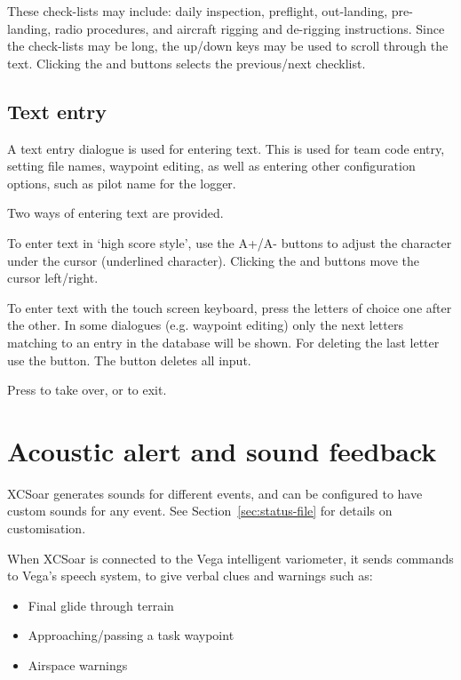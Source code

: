 These check-lists may include: daily inspection, preflight,
out-landing,  pre-landing, radio
procedures, and aircraft rigging and de-rigging instructions.  Since
the check-lists may be long, the up/down keys may be used to scroll
through the text. Clicking the \button{$<$} and \button{$>$} buttons
selects the previous/next checklist.


\subsection*{Text entry} \label{sec:textentry}

A text entry dialogue is used for entering text.  This is used for team
code entry, setting file names, waypoint editing, as well as entering
other configuration options, such as pilot name for the logger.

Two ways of entering text are provided. 

To enter text in `high score style', use the A+/A- buttons to adjust the 
character under the cursor (underlined character). Clicking the \button{$<$} 
and \button{$>$} buttons move the cursor left/right.  

To enter text with the touch screen keyboard, press the letters of choice 
one after the other. In some dialogues (e.g. waypoint editing) only the next 
letters matching to an entry in the database will be shown. For deleting the 
last letter use the \button{$<-$} button. The  button deletes all input.

Press  to take over, or  to exit.


\section{Acoustic alert and sound feedback}

XCSoar generates sounds for different events, and can be configured to
have custom sounds for any event.  See Section~\ref{sec:status-file} for
details on customisation.

When XCSoar is connected to the Vega intelligent variometer, it sends
commands to Vega's speech system, to give verbal clues and warnings such as:
\begin{itemize}
\item Final glide through terrain
\item Approaching/passing a task waypoint
\item Airspace warnings
\end{itemize}

